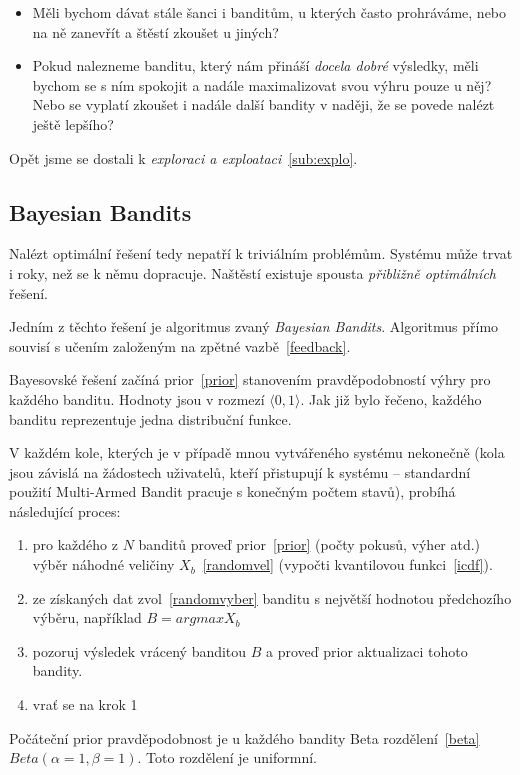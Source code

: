\documentclass[thesis=M,czech]{FITthesis}[2014/05/07]
\begin{document}
\begin{itemize}
	\item Měli bychom dávat stále šanci i banditům, u kterých často prohráváme, nebo na ně zanevřít a štěstí zkoušet u jiných?
	\item Pokud nalezneme banditu, který nám přináší \emph{docela dobré} výsledky, měli bychom se s ním spokojit a nadále maximalizovat svou výhru pouze u něj? Nebo se vyplatí zkoušet i nadále další bandity v naději, že se povede nalézt ještě lepšího?
\end{itemize}

Opět jsme se dostali k \emph{exploraci a exploataci}~\ref{sub:explo}.	

\subsection{Bayesian Bandits}
\label{bayes}
Nalézt optimální řešení tedy nepatří k triviálním problémům. Systému může trvat i roky, než se k němu dopracuje. Naštěstí existuje spousta \emph{přibližně optimálních} řešení.

Jedním z těchto řešení je algoritmus zvaný \emph{Bayesian Bandits}. Algoritmus přímo souvisí s učením založeným na zpětné vazbě~\ref{feedback}.

Bayesovské řešení začíná prior~\ref{prior} stanovením pravděpodobností výhry pro každého banditu. Hodnoty jsou v rozmezí $\langle0,1\rangle$. Jak již bylo řečeno, každého banditu reprezentuje jedna distribuční funkce.

V každém kole, kterých je v případě mnou vytvářeného systému nekonečně (kola jsou závislá na žádostech uživatelů, kteří přistupují k systému – standardní použití Multi-Armed Bandit pracuje s konečným počtem stavů), probíhá následující proces:

\begin{enumerate}
	\item pro každého z $N$ banditů proveď prior~\ref{prior} (počty pokusů, výher atd.) výběr náhodné veličiny $X_b$~\ref{randomvel} (vypočti kvantilovou funkci~\ref{icdf}). 
	\item ze získaných dat zvol~\ref{randomvyber} banditu s největší hodnotou předchozího výběru, například $B = argmax X_b$	
	\item pozoruj výsledek vrácený banditou $B$ a proveď prior aktualizaci tohoto bandity.
	\item vrať se na krok 1
\end{enumerate}

Počáteční prior pravděpodobnost je u každého bandity Beta rozdělení~\ref{beta} ${Beta}(\alpha = 1, \beta = 1)$. Toto rozdělení je uniformní.
\end{document}
